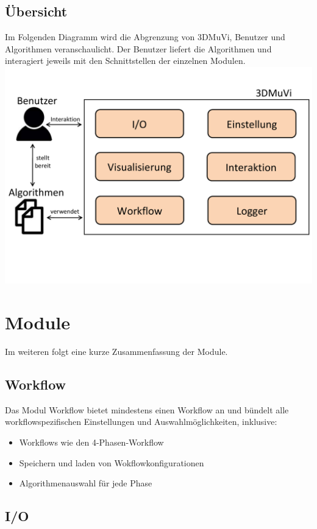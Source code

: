 \subsection{Übersicht}
Im Folgenden Diagramm wird die Abgrenzung von 3DMuVi, Benutzer und Algorithmen veranschaulicht.
Der Benutzer liefert die Algorithmen und interagiert jeweils mit den Schnittstellen der einzelnen Modulen.\newline
\includegraphics[width=1\textwidth]{img/SUebersicht.pdf}

\section{Module}
Im weiteren folgt eine kurze Zusammenfassung der Module.

\subsection{Workflow}
Das Modul Workflow bietet mindestens einen Workflow an und bündelt alle workflowspezifischen
Einstellungen und Auswahlmöglichkeiten, inklusive:

\begin{itemize}
\item Workflows wie den 4-Phasen-Workflow
\item Speichern und laden von Wokflowkonfigurationen
\item Algorithmenauswahl für jede Phase 
\end{itemize}

\subsection{I/O}

